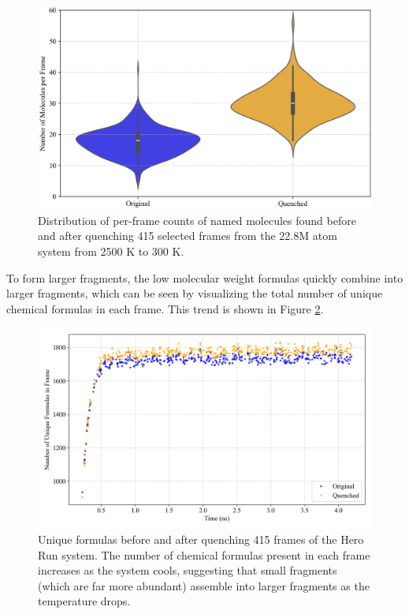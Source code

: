 \begin{figure}[!ht]
    \centering
    \includegraphics[width=0.885\linewidth]{Images/early_earth/updated_violins.png}
    \caption[Violin plot: total named molecules found before and after quenching system]{Distribution of per-frame counts of named molecules found before and after quenching 415 selected frames from the 22.8M atom system from 2500 K to 300 K.}
    \label{fig:ee_quench_violinplot}
\end{figure}

To form larger fragments, the low molecular weight formulas quickly combine into larger fragments, which can be seen by visualizing the total number of unique chemical formulas in each frame.
This trend is shown in Figure \ref{fig:quench_unique_formulas}.

\begin{figure}[!ht]
    \centering
    \includegraphics[width=1\linewidth]{Images/early_earth/quench_formula_vs_frame.png}
    \caption[Unique formulas before and after quenching system]{Unique formulas before and after quenching 415 frames of the Hero Run system. The number of chemical formulas present in each frame increases as the system cools, suggesting that small fragments (which are far more abundant) assemble into larger fragments as the temperature drops.}
    \label{fig:quench_unique_formulas}
\end{figure}

